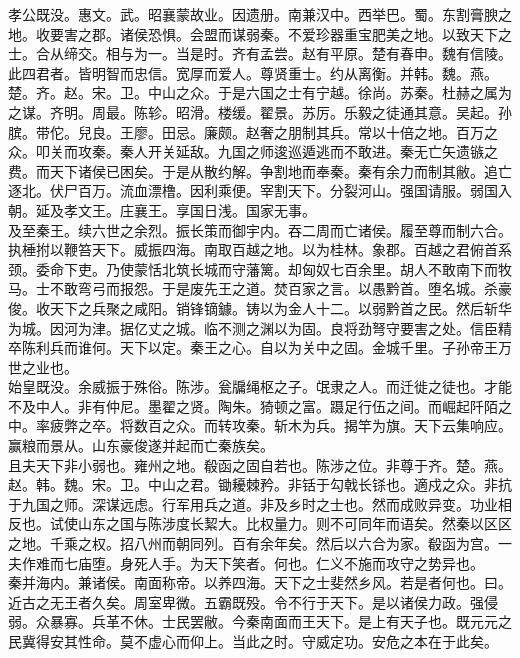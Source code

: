 \documentclass{zhvt-classic}
\begin{document}
\hspace*{2em}孝公既没。惠文。武。昭襄蒙故业。因遗册。南兼汉中。西举巴。蜀。东割膏腴之地。收要害之郡。诸侯恐惧。会盟而谋弱秦。不爱珍器重宝肥美之地。以致天下之士。合从缔交。相与为一。当是时。齐有孟尝。赵有平原。楚有春申。魏有信陵。此四君者。皆明智而忠信。宽厚而爱人。尊贤重士。约从离衡。并韩。魏。燕。楚。齐。赵。宋。卫。中山之众。于是六国之士有宁越。徐尚。苏秦。杜赫之属为之谋。齐明。周最。陈轸。昭滑。楼缓。翟景。苏厉。乐毅之徒通其意。吴起。孙膑。带佗。兒良。王廖。田忌。廉颇。赵奢之朋制其兵。常以十倍之地。百万之众。叩关而攻秦。秦人开关延敌。九国之师逡巡遁逃而不敢进。秦无亡矢遗镞之费。而天下诸侯已困矣。于是从散约解。争割地而奉秦。秦有余力而制其敝。追亡逐北。伏尸百万。流血漂橹。因利乘便。宰割天下。分裂河山。强国请服。弱国入朝。延及孝文王。庄襄王。享国日浅。国家无事。\\
\hspace*{2em}及至秦王。续六世之余烈。振长策而御宇内。吞二周而亡诸侯。履至尊而制六合。执棰拊以鞭笞天下。威振四海。南取百越之地。以为桂林。象郡。百越之君俯首系颈。委命下吏。乃使蒙恬北筑长城而守藩篱。却匈奴七百余里。胡人不敢南下而牧马。士不敢弯弓而报怨。于是废先王之道。焚百家之言。以愚黔首。堕名城。杀豪俊。收天下之兵聚之咸阳。销锋镝鐻。铸以为金人十二。以弱黔首之民。然后斩华为城。因河为津。据亿丈之城。临不测之渊以为固。良将劲弩守要害之处。信臣精卒陈利兵而谁何。天下以定。秦王之心。自以为关中之固。金城千里。子孙帝王万世之业也。\\
\hspace*{2em}始皇既没。余威振于殊俗。陈涉。瓮牖绳枢之子。氓隶之人。而迁徙之徒也。才能不及中人。非有仲尼。墨翟之贤。陶朱。猗顿之富。蹑足行伍之间。而崛起阡陌之中。率疲弊之卒。将数百之众。而转攻秦。斩木为兵。揭竿为旗。天下云集响应。赢粮而景从。山东豪俊遂并起而亡秦族矣。\\
\hspace*{2em}且夫天下非小弱也。雍州之地。殽函之固自若也。陈涉之位。非尊于齐。楚。燕。赵。韩。魏。宋。卫。中山之君。锄耰棘矜。非铦于勾戟长铩也。適戍之众。非抗于九国之师。深谋远虑。行军用兵之道。非及乡时之士也。然而成败异变。功业相反也。试使山东之国与陈涉度长絜大。比权量力。则不可同年而语矣。然秦以区区之地。千乘之权。招八州而朝同列。百有余年矣。然后以六合为家。殽函为宫。一夫作难而七庙堕。身死人手。为天下笑者。何也。仁义不施而攻守之势异也。\\
\hspace*{2em}秦并海内。兼诸侯。南面称帝。以养四海。天下之士斐然乡风。若是者何也。曰。近古之无王者久矣。周室卑微。五霸既殁。令不行于天下。是以诸侯力政。强侵弱。众暴寡。兵革不休。士民罢敝。今秦南面而王天下。是上有天子也。既元元之民冀得安其性命。莫不虚心而仰上。当此之时。守威定功。安危之本在于此矣。\\
\end{document}
